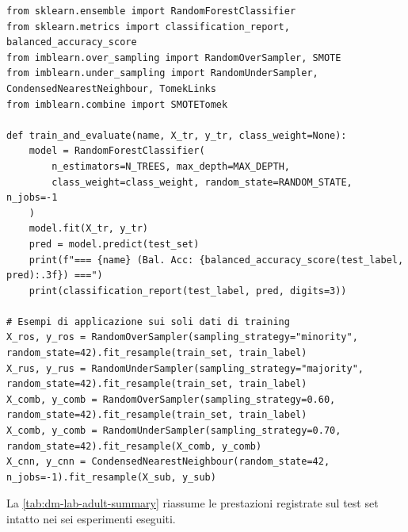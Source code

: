 \begin{lstlisting}[style=pythoncode, caption={Funzione di valutazione uniforme e applicazione dei ricampionatori imblearn.}]
from sklearn.ensemble import RandomForestClassifier
from sklearn.metrics import classification_report, balanced_accuracy_score
from imblearn.over_sampling import RandomOverSampler, SMOTE
from imblearn.under_sampling import RandomUnderSampler, CondensedNearestNeighbour, TomekLinks
from imblearn.combine import SMOTETomek

def train_and_evaluate(name, X_tr, y_tr, class_weight=None):
    model = RandomForestClassifier(
        n_estimators=N_TREES, max_depth=MAX_DEPTH,
        class_weight=class_weight, random_state=RANDOM_STATE, n_jobs=-1
    )
    model.fit(X_tr, y_tr)
    pred = model.predict(test_set)
    print(f"=== {name} (Bal. Acc: {balanced_accuracy_score(test_label, pred):.3f}) ===")
    print(classification_report(test_label, pred, digits=3))

# Esempi di applicazione sui soli dati di training
X_ros, y_ros = RandomOverSampler(sampling_strategy="minority", random_state=42).fit_resample(train_set, train_label)
X_rus, y_rus = RandomUnderSampler(sampling_strategy="majority", random_state=42).fit_resample(train_set, train_label)
X_comb, y_comb = RandomOverSampler(sampling_strategy=0.60, random_state=42).fit_resample(train_set, train_label)
X_comb, y_comb = RandomUnderSampler(sampling_strategy=0.70, random_state=42).fit_resample(X_comb, y_comb)
X_cnn, y_cnn = CondensedNearestNeighbour(random_state=42, n_jobs=-1).fit_resample(X_sub, y_sub)
\end{lstlisting}

La \autoref{tab:dm-lab-adult-summary} riassume le prestazioni registrate sul test set intatto nei sei esperimenti eseguiti.

